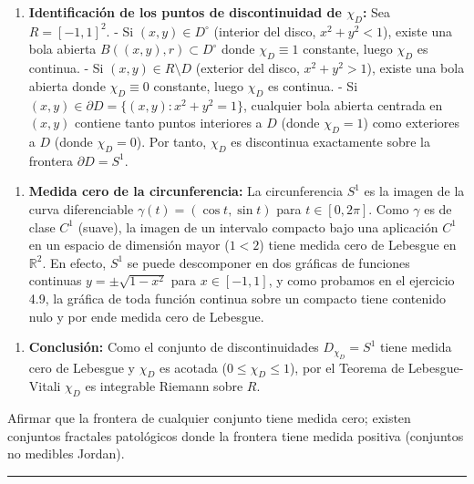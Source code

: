 \documentclass[11pt,a4paper]{article}
\begin{document}
\begin{enumerate}[label=\textbf{\arabic*.}]
\item \textbf{Identificación de los puntos de discontinuidad de $\chi_D$:}
Sea $R = [-1,1]^2$.
- Si $(x,y) \in D^\circ$ (interior del disco, $x^2 + y^2 < 1$), existe una bola abierta $B((x,y), r) \subset D^\circ$ donde $\chi_D \equiv 1$ constante, luego $\chi_D$ es continua.
- Si $(x,y) \in R \setminus D$ (exterior del disco, $x^2 + y^2 > 1$), existe una bola abierta donde $\chi_D \equiv 0$ constante, luego $\chi_D$ es continua.
- Si $(x,y) \in \partial D = \{(x,y) : x^2 + y^2 = 1\}$, cualquier bola abierta centrada en $(x,y)$ contiene tanto puntos interiores a $D$ (donde $\chi_D = 1$) como exteriores a $D$ (donde $\chi_D = 0$).
Por tanto, $\chi_D$ es discontinua exactamente sobre la frontera $\partial D = S^1$.
\end{enumerate}

\begin{enumerate}[label=\textbf{\arabic*.}]
\item \textbf{Medida cero de la circunferencia:}
La circunferencia $S^1$ es la imagen de la curva diferenciable $\gamma(t) = (\cos t, \sin t)$ para $t \in [0, 2\pi]$.
Como $\gamma$ es de clase $C^1$ (suave), la imagen de un intervalo compacto bajo una aplicación $C^1$ en un espacio de dimensión mayor ($1 < 2$) tiene medida cero de Lebesgue en $\mathbb{R}^2$.
En efecto, $S^1$ se puede descomponer en dos gráficas de funciones continuas $y = \pm \sqrt{1 - x^2}$ para $x \in [-1,1]$, y como probamos en el ejercicio 4.9, la gráfica de toda función continua sobre un compacto tiene contenido nulo y por ende medida cero de Lebesgue.
\end{enumerate}

\begin{enumerate}[label=\textbf{\arabic*.}]
\item \textbf{Conclusión:}
Como el conjunto de discontinuidades $D_{\chi_D} = S^1$ tiene medida cero de Lebesgue y $\chi_D$ es acotada ($0 \le \chi_D \le 1$), por el Teorema de Lebesgue-Vitali $\chi_D$ es integrable Riemann sobre $R$.
\end{enumerate}

\begin{trapbox}
Afirmar que la frontera de cualquier conjunto tiene medida cero; existen conjuntos fractales patológicos donde la frontera tiene medida positiva (conjuntos no medibles Jordan).
\end{trapbox}

\vspace{0.5cm}
\hrule
\vspace{0.5cm}
\end{document}
